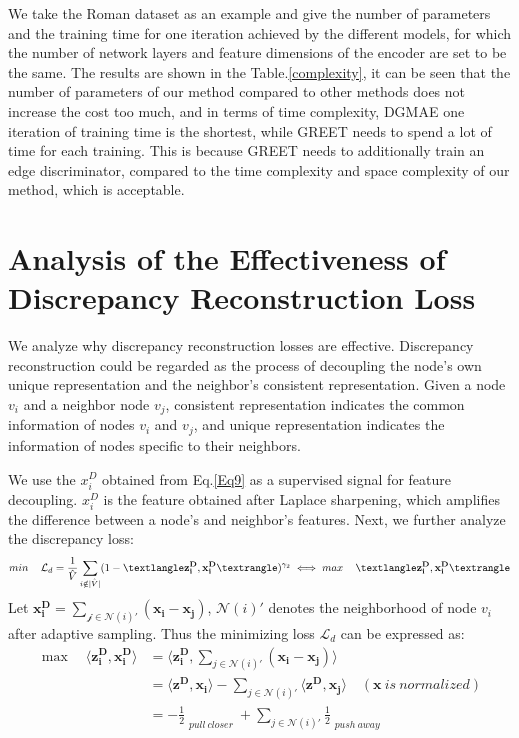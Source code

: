 \documentclass[sigconf]{acmart}
\begin{document}
We take the Roman dataset as an example and give the number of parameters and the training time for one iteration achieved by the different models, for which the number of network layers and feature dimensions of the encoder are set to be the same. The results are shown in the Table.\ref{complexity}, it can be seen that the number of parameters of our method compared to other methods does not increase the cost too much, and in terms of time complexity, DGMAE one iteration of training time is the shortest, while GREET needs to spend a lot of time for each training. This is because GREET needs to additionally train an edge discriminator, compared to the time complexity and space complexity of our method, which is acceptable.

\section{Analysis of the Effectiveness of Discrepancy Reconstruction Loss}
\label{loss analysis}
We analyze why discrepancy reconstruction losses are effective. Discrepancy reconstruction could be regarded as the process of decoupling the node's own unique representation and the neighbor's consistent representation. Given a node $v_i$ and a neighbor node $v_j$, consistent representation indicates the common information of nodes $v_i$ and $v_j$, and unique representation indicates the information of nodes specific to their neighbors. 

We use the $x_i^D$ obtained from Eq.\ref{Eq9} as a supervised signal for feature decoupling. $x_i^D$ is the feature obtained after Laplace sharpening, which amplifies the difference between a node's and neighbor's features. Next, we further analyze the discrepancy loss:
\begin{equation}
\mathop{min} \quad\mathcal{L}_d  = \frac{1}{\hat{V}} \sum \limits_{i \notin \hat{|V|}} (1- 
⟨\mathbf{z_i^D},\mathbf{x_i^D}⟩)^{\gamma_2} \iff \mathop{max} \quad ⟨\mathbf{z_i^D},\mathbf{x_i^D}⟩\\
\end{equation}
Let $\mathbf{x_i^D}=\sum \limits_{\mathcal{j} \in \mathcal{N}(i)'}(\mathbf{x_i}-\mathbf{x_j})$, $\mathcal{N}(i)'$ denotes the neighborhood of node $v_i$ after adaptive sampling. Thus the minimizing loss $\mathcal{L}_d$ can be expressed as:
\begin{equation}
    \begin{aligned}
\mathop{max} \quad⟨\mathbf{z_i^D} ,\mathbf{x_i^D}⟩ 
&=⟨\mathbf{z_i^D} ,\sum_{j \in \mathcal{N}(i)'} (\mathbf{x_i}-\mathbf{x_j})⟩\\
&=⟨\mathbf{z^D},\mathbf{x_i}⟩-\sum_{j \in \mathcal{N}(i)'} ⟨\mathbf{z^D},\mathbf{x_j}⟩ \quad (\mathbf{x}\  is \ normalized)\\
&=-\frac{1}{2}\mathop{\underline{||\mathbf{z^D_i}-\mathbf{x_i}||}^2}\limits_{pull\ closer} +\sum \limits_{j \in \mathcal{N}(i)'}\frac{1}{2}\mathop{\underline{||\mathbf{z^D_i}-\mathbf{x_j}||}^2}\limits_{push\ away}
\end{aligned}
\end{equation}
\end{document}
